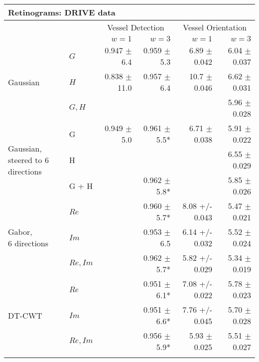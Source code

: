 \begin{tabularx}{\linewidth}{X X r r r r}
\toprule
\multicolumn{6}{l}{Retinograms: DRIVE data} \\
\midrule
            &           & \multicolumn{2}{c}{Vessel Detection}    &   \multicolumn{2}{c}{Vessel Orientation}  \\
            &           & $w = 1$         & $w = 3$         &   $w = 1$       &   $w = 3$   \\
\midrule
\multirow{3}{3cm}{ Gaussian }
            & $G$         & 0.947 $\pm$ 6.4   & 0.959 $\pm$ 5.3   & 6.89 $\pm$ 0.042  & 6.04 $\pm$ 0.037 \\
            & $H$         & 0.838 $\pm$ 11.0  & 0.957 $\pm$ 6.4   & 10.7 $\pm$ 0.046  & 6.62 $\pm$ 0.031 \\
            & $G, H$      &               &               &               & 5.96 $\pm$ 0.028 \\
\midrule
\multirow{3}{3cm}{Gaussian, \newline steered to 6 directions}
            & G         & 0.949 $\pm$ 5.0   & 0.961 $\pm$ 5.5*  & 6.71 $\pm$ 0.038  & 5.91 $\pm$ 0.022 \\
            & H         &               &               &               & 6.55 $\pm$ 0.029 \\
            & G + H     &               & 0.962 $\pm$ 5.8*  &               & 5.85 $\pm$ 0.026 \\
\midrule
\multirow{3}{3cm}{Gabor, \newline 6 directions}
            & $Re$        &               & 0.960 $\pm$ 5.7*  &8.08 +/- 0.043& 5.47 $\pm$ 0.021 \\
            & $Im$        &               & 0.953 $\pm$ 6.5   &6.14 +/- 0.032& 5.52 $\pm$ 0.024 \\
            & $Re,Im$   &               & 0.962 $\pm$ 5.7*  &5.82 +/- 0.029& 5.34 $\pm$ 0.019 \\
\midrule
\multirow{3}{3cm}{DT-CWT}
            & $Re$        &               & 0.951 $\pm$ 6.1*  &7.08 +/- 0.022& 5.78 $\pm$ 0.023 \\
            & $Im$        &               & 0.951 $\pm$ 6.6*  &7.76 +/- 0.045& 5.70 $\pm$ 0.028 \\
            & $Re,Im$     &               & 0.956 $\pm$ 5.9*  & 5.93 $\pm$ 0.025& 5.51 $\pm$ 0.027 \\
\bottomrule
\noalign{\smallskip}
\end{tabularx} 